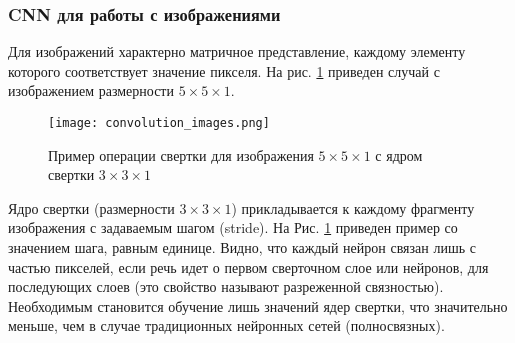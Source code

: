 \subsubsection{CNN для работы с изображениями}
Для изображений характерно матричное представление, 
каждому элементу которого соответствует значение пикселя. 
На рис. \ref{fig:cnn2}
приведен случай с изображением размерности $5 \times 5 \times 1$.  
\begin{figure}[ht]
    \centering
    \texttt{[image: convolution\_images.png]}
    \caption{Пример операции свертки для изображения $5\times 5\times 1$ с ядром свертки $3\times 3\times 1$}
    \label{fig:cnn2}
\end{figure}
Ядро свертки (размерности $3 \times 3 \times 1$) прикладывается к каждому фрагменту изображения с задаваемым шагом (stride). 
На Рис. \ref{fig:cnn2} приведен пример со значением шага, равным единице.
Видно, что каждый нейрон связан лишь с частью пикселей, если речь идет о первом сверточном слое или нейронов, 
для последующих слоев (это свойство называют разреженной связностью). Необходимым становится обучение лишь значений ядер свертки, 
что значительно меньше, чем в случае традиционных нейронных сетей (полносвязных).

